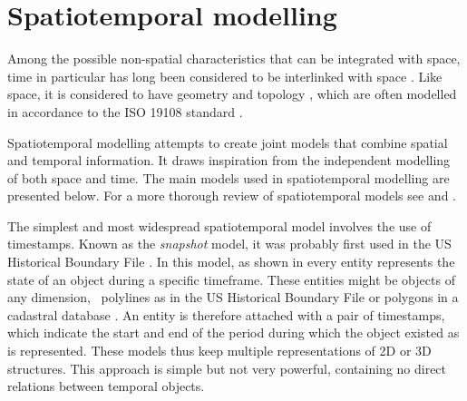 \section{Spatiotemporal modelling}
\label{se:modelling-time}

Among the possible non-spatial characteristics that can be integrated with space, time in particular has long been considered to be interlinked with space \citep{Akhundov86}.
Like space, it is considered to have geometry and topology \citep{Earman77}, which are often modelled in accordance to the ISO 19108 standard \citep{ISO19108:2002}.

Spatiotemporal modelling attempts to create joint models that combine spatial and temporal information.
It draws inspiration from the independent modelling of both space and time.
The main models used in spatiotemporal modelling are presented below.
For a more thorough review of spatiotemporal models see \citet{Al-Taha94} and \citet{Pelekis04}.

The simplest and most widespread spatiotemporal model involves the use of timestamps.
Known as the \emph{snapshot} model, it was probably first used in the US Historical Boundary File \citep{Basoglu78}.
In this model, as shown in  every entity represents the state of an object during a specific timeframe.
These entities might be objects of any dimension, \eg\ polylines as in the US Historical Boundary File or polygons in a cadastral database \citep{Hunter90}.
An entity is therefore attached with a pair of timestamps, which indicate the start and end of the period during which the object existed as is represented.
These models thus keep multiple representations of 2D \citep{Armstrong88} or 3D \citep{Hamre97} structures.
This approach is simple but not very powerful, containing no direct relations between temporal objects.

